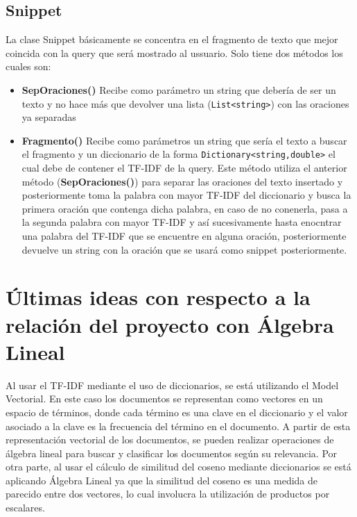 \documentclass[a4paper,12pt]{article}
\begin{document}
\subsection{Snippet}\label{sub:Sni}

La clase Snippet básicamente se concentra en el fragmento de texto que mejor coincida con la query que será mostrado al ussuario. Solo tiene dos métodos los 
cuales son:

\begin{itemize}

    \item \textbf{SepOraciones()}
Recibe como parámetro un string que debería de ser un texto y no hace más que devolver una lista (\texttt{List\textless string\textgreater}) con las oraciones ya separadas

    \item \textbf{Fragmento()}
Recibe como parámetros un string que sería el texto a buscar el fragmento y un diccionario de la forma \texttt{Dictionary\textless string,double\textgreater} el cual debe de contener el TF-IDF de la query. Este método utiliza el anterior método (\textbf{SepOraciones()}) para separar las oraciones del texto insertado y posteriormente toma la palabra con mayor TF-IDF del diccionario y busca la primera oración que contenga dicha palabra, en caso de no conenerla, pasa a la segunda palabra con mayor TF-IDF y así sucesivamente hasta enocntrar una palabra del TF-IDF que se encuentre en alguna oración, posteriormente devuelve un string con la oración que se usará como snippet posteriormente.
\end{itemize}

\section{Últimas ideas con respecto a la relación del proyecto con Álgebra Lineal}\label{sec:AL}

Al usar el TF-IDF mediante el uso de diccionarios, se está utilizando el Model Vectorial. En este caso los documentos se representan como vectores en un espacio de términos, donde cada término es una clave en el diccionario y el valor asociado a la clave es la frecuencia del término en el documento. A partir de esta representación vectorial de los documentos, se pueden realizar operaciones de álgebra lineal para buscar y clasificar los documentos según su relevancia. Por otra parte, al usar el cálculo de similitud del coseno mediante diccionarios se está aplicando Álgebra Lineal ya que la similitud del coseno es una medida de parecido entre dos vectores, lo cual involucra la utilización de productos por escalares.


\newpage

\tableofcontents
\end{document}
